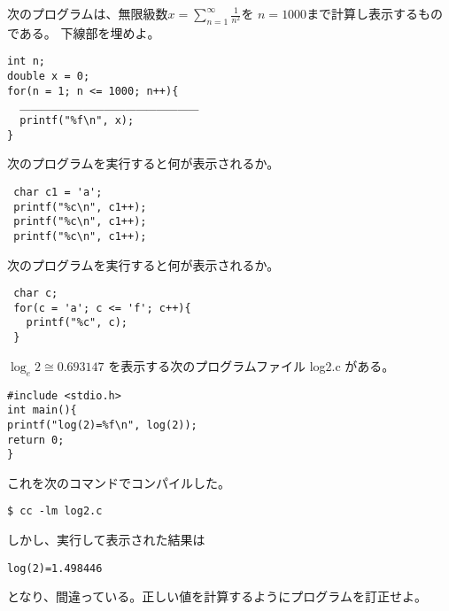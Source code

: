 \documentclass[12pt,a4j]{jarticle}
\newcounter{toi}
\def\toi{%
\bigskip\bigskip\noindent
\addtocounter{toi}{1}
\shadowbox{\bfseries\large 問\thetoi}
\nopagebreak[4]\bigskip\nopagebreak[4]
}
\begin{document}



\toi


次のプログラムは、無限級数$x=\displaystyle\sum_{n=1}^\infty\frac{1}{n^2}$を
$n=1000$まで計算し表示するものである。
下線部を埋めよ。
\begin{verbatim}
int n;
double x = 0;
for(n = 1; n <= 1000; n++){
  ＿＿＿＿＿＿＿＿＿＿＿＿＿＿＿＿＿
  printf("%f\n", x);
}
\end{verbatim}




\toi


次のプログラムを実行すると何が表示されるか。
\begin{verbatim}
 char c1 = 'a';
 printf("%c\n", c1++);
 printf("%c\n", c1++);
 printf("%c\n", c1++);
\end{verbatim}




\toi


次のプログラムを実行すると何が表示されるか。
\begin{verbatim}
 char c;
 for(c = 'a'; c <= 'f'; c++){
   printf("%c", c);
 }
\end{verbatim}



\toi



$\log_e 2 \cong 0.693147$ を表示する次のプログラムファイル {\ttfamily log2.c} がある。
\begin{verbatim}
#include <stdio.h>
int main(){
printf("log(2)=%f\n", log(2));
return 0;
}
\end{verbatim}
これを次のコマンドでコンパイルした。
\begin{verbatim}
$ cc -lm log2.c
\end{verbatim}
しかし、実行して表示された結果は
\begin{verbatim}
log(2)=1.498446
\end{verbatim}
となり、間違っている。正しい値を計算するようにプログラムを訂正せよ。


\end{document}
